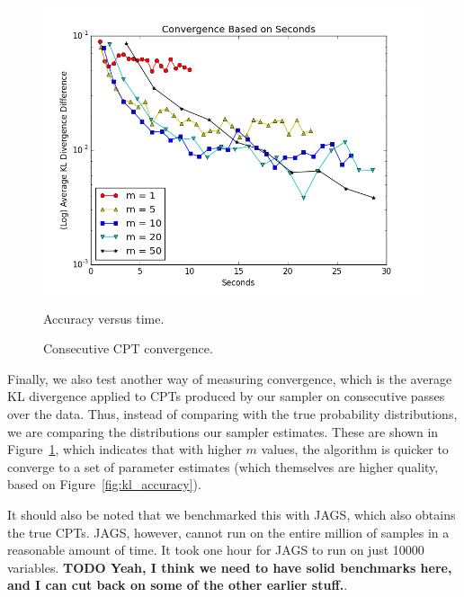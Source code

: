 \documentclass{article} %
\begin{document}
\begin{figure}[t]
  \centering
  \begin{minipage}{.5\textwidth}
    \centering
    \includegraphics[width=1\textwidth]{fig_kl_time_log}
    \caption{Accuracy versus time.}
    \label{fig:kl_time}
  \end{minipage}\hfill
    \begin{minipage}{.5\textwidth}
    \centering
    \fbox{\rule[-.5cm]{0cm}{4cm} \rule[-.5cm]{4cm}{0cm}}
    \caption{Consecutive CPT convergence.}
    \label{fig:consecutive_cpts}
  \end{minipage}
\end{figure}

Finally, we also test another way of measuring convergence, which is the average KL divergence
applied to CPTs produced by our sampler on consecutive passes over the data. Thus, instead of
comparing with the true probability distributions, we are comparing the distributions our sampler
estimates. These are shown in Figure~\ref{fig:consecutive_cpts}, which indicates that with higher
$m$ values, the algorithm is quicker to converge to a set of parameter estimates (which themselves
are higher quality, based on Figure~\ref{fig:kl_accuracy}).

It should also be noted that we benchmarked this with JAGS, which also obtains the true CPTs. JAGS,
however, cannot run on the entire million of samples in a reasonable amount of time. It took one
hour for JAGS to run on just 10000 variables. \textbf{TODO Yeah, I think we need to have solid
benchmarks here, and I can cut back on some of the other earlier stuff.}.
\end{document}
